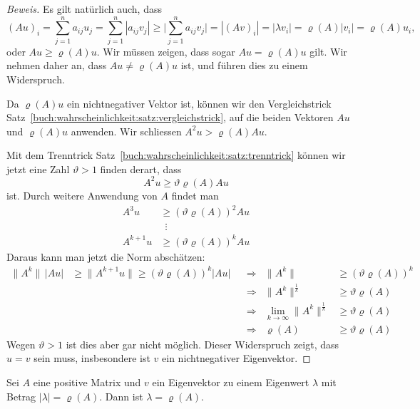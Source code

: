 \begin{proof}[Beweis]
Es gilt natürlich auch, dass
\[
(Au)_i
=
\sum_{j=1}^n a_{ij}u_j
=
\sum_{j=1}^n |a_{ij}v_j|
\ge
\biggl|
\sum_{j=1}^n a_{ij}v_j
\biggr|
=
|(Av)_i|
=
|\lambda v_i|
=
\varrho(A) |v_i|
=
\varrho(A) u_i,
\]
oder $Au \ge \varrho(A)u$.
Wir müssen zeigen, dass sogar $Au=\varrho(A)u$ gilt.
Wir nehmen daher an, dass $Au\ne \varrho(A)u$ ist, und führen dies zu
einem Widerspruch.

Da $\varrho(A)u$ ein nichtnegativer Vektor ist, können wir den Vergleichstrick
Satz~\ref{buch:wahrscheinlichkeit:satz:vergleichstrick}, auf die beiden
Vektoren $Au$ und $\varrho(A)u$ anwenden.
Wir schliessen $A^2u > \varrho(A)Au$.

Mit dem Trenntrick
Satz~\ref{buch:wahrscheinlichkeit:satz:trenntrick}
können wir jetzt eine Zahl $\vartheta>1$ finden derart, dass
\[
A^2 u \ge \vartheta \varrho(A) Au
\]
ist.
Durch weitere Anwendung von $A$ findet man
\begin{align*}
A^3 u & \ge (\vartheta \varrho(A))^2 Au
\\
&\phantom{0}\vdots
\\
A^{k+1} u & \ge (\vartheta \varrho(A))^{k} Au
\end{align*}
Daraus kann man jetzt die Norm abschätzen:
\[
\begin{aligned}
\| A^{k}\|\, |Au|
&\ge 
\| A^{k+1}u\|
\ge
(\vartheta\varrho(A))^{k} |Au|
&&
\Rightarrow
&
\|A^k\| &\ge  (\vartheta\varrho(A))^k 
\\
&&&\Rightarrow&
\|A^k\|^{\frac{1}{k}} &\ge \vartheta\varrho(A)
\\
&&&\Rightarrow&
\lim_{k\to\infty}
\|A^k\|^{\frac{1}{k}} &\ge \vartheta\varrho(A)
\\
&&&\Rightarrow&
\varrho(A)&\ge \vartheta\varrho(A)
\end{aligned}
\]
Wegen $\vartheta>1$ ist dies aber gar nicht möglich.
Dieser Widerspruch zeigt, dass $u=v$ sein muss, insbesondere ist
$v$ ein nichtnegativer Eigenvektor.
\end{proof}

\begin{satz}
Sei $A$ eine positive Matrix und $v$ ein Eigenvektor zu einem 
Eigenwert $\lambda$ mit Betrag $|\lambda|=\varrho(A)$.
Dann ist $\lambda=\varrho(A)$.
\end{satz}

